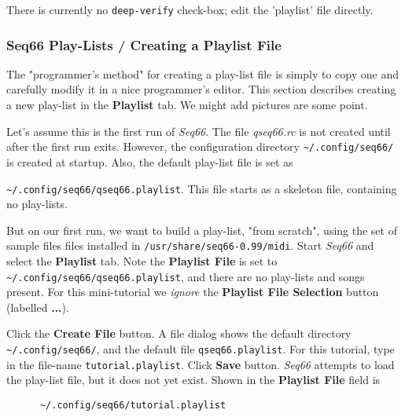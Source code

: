    There is currently no \texttt{deep-verify} check-box; edit the 'playlist'
   file directly.

\subsubsection{Seq66 Play-Lists / Creating a Playlist File}
\label{subsubsec:playlist_creating_playlist_file}

   The "programmer's method" for creating a play-list file is simply to copy
   one and carefully modify it in a nice programmer's editor.
   This section describes creating a new play-list in the \textbf{Playlist}
   tab.  We might add pictures are some point.

   Let's assume this is the first run of \textsl{Seq66}.
   The file \textsl{qseq66.rc} is not created until after the first
   run exits.
   However, the configuration directory
   \texttt{\textasciitilde/.config/seq66/} is created at startup.
   Also, the default play-list file is set as

   \texttt{\textasciitilde/.config/seq66/qseq66.playlist}.
   This file starts as a skeleton file, containing no play-lists.

   But on our first run, we want to build a play-list, "from scratch",
   using the set of sample files files installed in
   \texttt{/usr/share/seq66-0.99/midi}.
   Start \textsl{Seq66} and select the \textbf{Playlist} tab.
   Note the \textbf{Playlist File} is set to
   \texttt{\textasciitilde/.config/seq66/qseq66.playlist}, and
   there are no play-lists and songs present.
   For this mini-tutorial we \textsl{ignore}
   the \textbf{Playlist File Selection}
   button (labelled \textbf{...}).

   Click the \textbf{Create File} button.
   A file dialog shows the default directory
   \texttt{\textasciitilde/.config/seq66/}, and the default file
   \texttt{qseq66.playlist}.
   For this tutorial, type in the file-name
   \texttt{tutorial.playlist}.
   Click \textbf{Save} button.
   \textsl{Seq66} attempts to load the play-list file, but it
   does not yet exist.
   Shown in the \textbf{Playlist File} field is

   \begin{verbatim}
      ~/.config/seq66/tutorial.playlist
   \end{verbatim}

